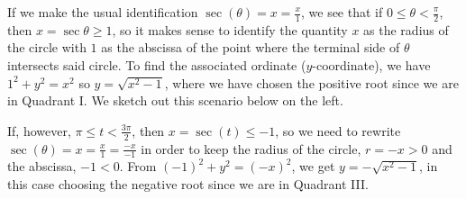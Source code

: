 \documentclass{ximera}
\begin{document}
 

If we make the usual identification $\sec(\theta) = x = \frac{x}{1}$, we see that if $0 \leq \theta < \frac{\pi}{2}$, then $x = \sec{\theta} \geq 1$, so it makes sense to identify the quantity $x$ as the radius of the circle with $1$ as the abscissa of the point where the terminal side of $\theta$ intersects said circle.  To find the associated ordinate ($y$-coordinate), we have $1^2 + y^2 = x^2$ so $y =  \sqrt{x^2-1}$, where we have chosen the positive root since we are in Quadrant I.   We sketch out this scenario below on the left.

 

If, however, $ \pi \leq t < \frac{3\pi}{2}$, then $x = \sec(t) \leq -1$, so we need to rewrite $\sec(\theta) = x = \frac{x}{1} = \frac{-x}{-1}$ in order to keep the radius of the circle, $r = -x > 0$ and the abscissa, $-1 < 0$.  From $(-1)^2+y^2 = (-x)^2$, we  get $y = -\sqrt{x^2-1}$, in this case choosing the negative root since we are in Quadrant III.
\end{document}
